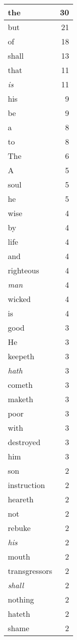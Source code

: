 \begin{center}
\begin{longtable}{l|r}
the & 30\\ \hline 
but & 21\\ \hline 
of & 18\\ \hline 
shall & 13\\ \hline 
that & 11\\ \hline 
\emph{is} & 11\\ \hline 
his & 9\\ \hline 
be & 9\\ \hline 
a & 8\\ \hline 
to & 8\\ \hline 
The & 6\\ \hline 
A & 5\\ \hline 
soul & 5\\ \hline 
he & 5\\ \hline 
wise & 4\\ \hline 
by & 4\\ \hline 
life & 4\\ \hline 
and & 4\\ \hline 
righteous & 4\\ \hline 
\emph{man} & 4\\ \hline 
wicked & 4\\ \hline 
is & 4\\ \hline 
good & 3\\ \hline 
He & 3\\ \hline 
keepeth & 3\\ \hline 
\emph{hath} & 3\\ \hline 
cometh & 3\\ \hline 
maketh & 3\\ \hline 
poor & 3\\ \hline 
with & 3\\ \hline 
destroyed & 3\\ \hline 
him & 3\\ \hline 
son & 2\\ \hline 
instruction & 2\\ \hline 
heareth & 2\\ \hline 
not & 2\\ \hline 
rebuke & 2\\ \hline 
\emph{his} & 2\\ \hline 
mouth & 2\\ \hline 
transgressors & 2\\ \hline 
\emph{shall} & 2\\ \hline 
nothing & 2\\ \hline 
hateth & 2\\ \hline 
shame & 2\\ \hline 

\end{longtable}
\end{center}
